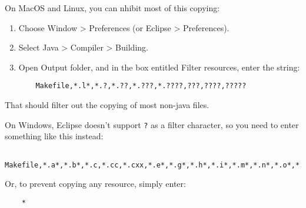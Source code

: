 \documentclass{article}
\begin{document}
On MacOS and Linux, you can nhibit most of this copying:

\begin{enumerate}

\item Choose {\sf Window > Preferences} (or {\sf Eclipse > Preferences}).

\item Select {\sf Java > Compiler > Building}.

\item Open {\sf Output folder}, and in the box entitled {\sf Filter resources},
  enter the string:

\begin{lstlisting}
    Makefile,*.l*,*.?,*.??,*.???,*.????,???,????,?????
\end{lstlisting}

\end{enumerate}

That should filter out the copying of most non-java files.

On Windows, Eclipse doesn't support {\tt ?} as a filter character, so
you need to enter something like this instead:

\begin{lstlisting}
    Makefile,*.a*,*.b*,*.c,*.cc,*.cxx,*.e*,*.g*,*.h*,*.i*,*.m*,*.n*,*.o*,*.r*,*.s*,*.t*
\end{lstlisting}

Or, to prevent copying any resource, simply enter: 
\begin{lstlisting}
    *
\end{lstlisting}

%
%
%
\end{document}
